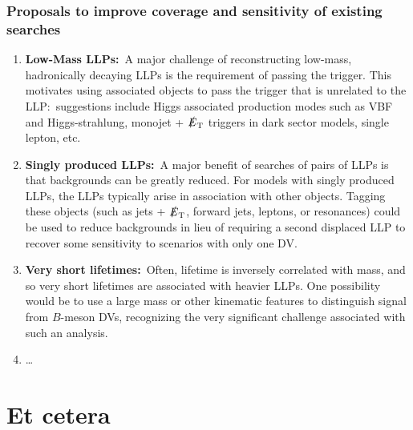 \subsubsection{Proposals to improve coverage and sensitivity of existing searches}

\begin{enumerate}

\item {\bf Low-Mass LLPs:}~A major challenge of reconstructing low-mass, hadronically decaying LLPs is the requirement of passing the trigger. This motivates using associated objects to pass the trigger that is unrelated to the LLP:~suggestions include Higgs associated production modes such as VBF and Higgs-strahlung, monojet + $\slashed{E}_{\rm T}$ triggers in dark sector models, single lepton, etc.

\item {\bf Singly produced LLPs:}~A major benefit of searches of pairs of LLPs is that backgrounds can be greatly reduced. For models with singly produced LLPs, the LLPs typically arise in association with other objects. Tagging these objects (such as jets + $\slashed{E}_{\rm T}$, forward jets, leptons, or resonances) could be used to reduce backgrounds in lieu of requiring a second displaced LLP to recover some sensitivity to scenarios with only one DV.

\item {\bf Very short lifetimes:}~Often, lifetime is inversely correlated with mass, and so very short lifetimes are associated with heavier LLPs. One possibility would be to use a large mass or other kinematic features to distinguish signal from $B$-meson DVs, recognizing the very significant challenge associated with such an analysis.


\item \ldots

\end{enumerate}




\section{Et cetera}
